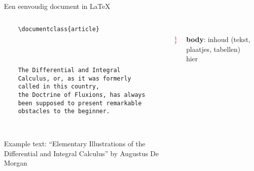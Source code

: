 \copyrightTim

\begin{frame}[fragile, t]{Een eenvoudig document in \LaTeX}
	\begin{columns}[t]
        \begin{column}{0.5\textwidth}
			\vspace{-20pt}
	\begin{verbatim} 
	\documentclass{article}

		
	

	The Differential and Integral 
	Calculus, or, as it was formerly 
	called in this country, 
	the Doctrine of Fluxions, has always 
	been supposed to present remarkable 
	obstacles to the beginner.

	
	\end{verbatim}

	{\tiny
	Example text: ``Elementary Illustrations of the Differential and Integral Calculus''
	by Augustus De Morgan
	\par}
\end{column}
\begin{column}{0.05\textwidth}
	\vspace{0pt}

	\phantom{{\Huge \textcolor{red}{ \} } }}\\[1.5cm]
	{\Huge \textcolor{red}{ \} } }
\end{column}
\begin{column}{0.4\textwidth}
	\vspace{0pt}

	\leavevmode{} \phantom{here}\\[1.5cm]
	\textbf{body}: inhoud (tekst, plaatjes, tabellen) hier
\end{column}
\end{columns}

\end{frame}
